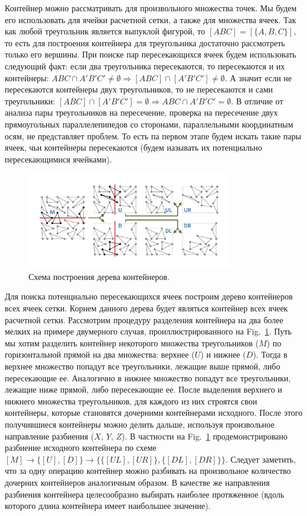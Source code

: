 Контейнер можно рассматривать для произвольного множества точек.
Мы будем его использовать для ячейки расчетной сетки, а также для множества ячеек.
Так как любой треугольник является выпуклой фигурой, то $[ABC] = [\{A, B, C\}]$, то есть для построения контейнера для треугольника достаточно рассмотреть только его вершины.
При поиске пар пересекающихся ячеек будем использовать следующий факт: если два треугольника пересекаются, то пересекаются и их контейнеры: $ABC \cap A'B'C' \ne \emptyset \Rightarrow [ABC] \cap [A'B'C'] \ne \emptyset$.
А значит если не пересекаются контейнеры двух треугольников, то не пересекаются и сами треугольники: $[ABC] \cap [A'B'C'] = \emptyset \Rightarrow ABC \cap A'B'C' = \emptyset$.
В отличие от анализа пары треугольников на пересечение, проверка на пересечение двух прямоугольных параллелепипедов со сторонами, параллельными координатным осям, не представляет проблем.
То есть па первом этапе будем искать такие пары ячеек, чьи контейнеры пересекаются (будем называть их потенциально пересекающимися ячейками).

\begin{figure}[h]
\includegraphics[width=0.8\textwidth]{pics/pic_box_size.pdf}
\caption{Схема построения дерева контейнеров.}\label{fig:pic_box}
\end{figure}

Для поиска потенциально пересекающихся ячеек построим дерево контейнеров всех ячеек сетки.
Корнем данного дерева будет являться контейнер всех ячеек расчетной сетки.
Рассмотрим процедуру разделения контейнера на два более мелких на примере двумерного случая, проиллюстрированного на Fig.~\ref{fig:pic_box}.
Путь мы хотим разделить контейнер некоторого множества треугольников ($M$) по горизонтальной прямой на два множества: верхнее ($U$) и нижнее ($D$).
Тогда в верхнее множество попадут все треугольники, лежащие выше прямой, либо пересекающие ее.
Аналогично в нижнее множество попадут все треугольники, лежащие ниже прямой, либо пересекающие ее.
После выделения верхнего и нижнего множества треугольников, для каждого из них строятся свои контейнеры, которые становятся дочерними контейнерами исходного.
После этого получившиеся контейнеры можно делить дальше, используя произвольное направление разбиения ($X$, $Y$, $Z$).
В частности на Fig.~\ref{fig:pic_box} продемонстрировано разбиение исходного контейнера по схеме $[M] \rightarrow \{[U], [D]\} \rightarrow \{\{[UL], [UR]\}, \{[DL], [DR]\}\}$.
Следует заметить, что за одну операцию контейнер можно разбивать на произвольное количество дочерних контейнеров аналогичным образом.
В качестве же направления разбиения контейнера целесообразно выбирать наиболее протяженное (вдоль которого длина контейнера имеет наибольшее значение).

